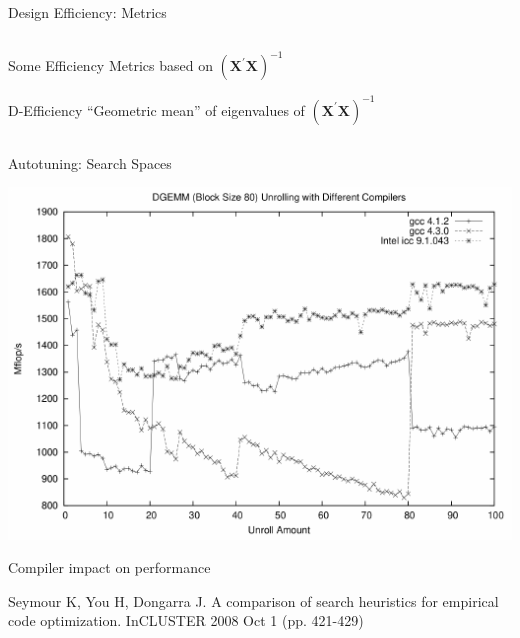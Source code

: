 \documentclass[10pt, compress, aspectratio=169, xcolor={table,usenames,dvipsnames}]{beamer}
\begin{document}
\begin{frame}[label={sec:orgb465c7c}]{Design Efficiency: Metrics}
\begin{columns}
\begin{column}{0.5\columnwidth}
\begin{block}{Some Efficiency Metrics based on \(\left(\bm{X}^{\prime}\bm{X}\right)^{-1}\)}
\begin{block}{D-Efficiency}
\vspace{-.3cm}
\colorbox{Accent!25}{``Geometric mean'' of eigenvalues of \(\left(\bm{X}^{\prime}\bm{X}\right)^{-1}\)}
\end{block}
\end{block}
\end{column}
\end{columns}
\end{frame}
\begin{frame}[label={sec:org0aa0cd3}]{Autotuning: Search Spaces}
\addtocounter{framenumber}{-1}
\begin{center}
\begin{center}
\includegraphics[width=.6\linewidth]{../img/seymour2008comparison_compilers.pdf}
\end{center}

\vspace{-.2cm}

\alert{Compiler impact} on performance

\scriptsize{Seymour K, You H, Dongarra J. A comparison of search heuristics for empirical code optimization. InCLUSTER 2008 Oct 1 (pp. 421-429)}
\end{center}
\end{frame}
\end{document}
